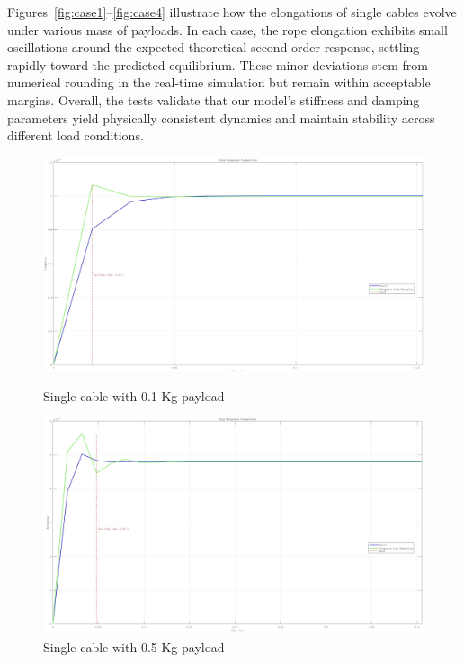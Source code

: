 \documentclass[12pt,twoside,letterpaper]{article}
\begin{document}
Figures~\ref{fig:case1}--\ref{fig:case4} illustrate how the elongations of single cables evolve under various mass of payloads. In each case, the rope elongation exhibits small oscillations around the expected theoretical second-order response, settling rapidly toward the predicted equilibrium.
 These minor deviations stem from numerical rounding in the real-time simulation but remain within acceptable margins. Overall, the tests validate that our model’s stiffness and damping parameters yield physically consistent dynamics and maintain stability across different load conditions.


\begin{figure}[H]
    \centering
    \begin{minipage}{0.49\textwidth}
        \centering
        \includegraphics[width=\linewidth]{figures/0.1s.jpg}
        \caption{Single cable with 0.1 Kg payload}
        \label{fig:case1}
    \end{minipage}
    \hfill
    \begin{minipage}{0.49\textwidth}
        \centering
        \includegraphics[width=\linewidth]{figures/0.5s.jpg}
        \caption{Single cable with 0.5 Kg payload}
        \label{fig:case2}
    \end{minipage}
    

\end{figure}
\end{document}
